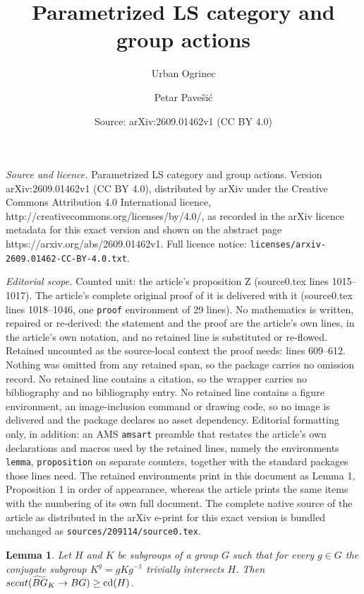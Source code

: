 \documentclass[10pt,a4paper]{amsart}
\title{Parametrized LS category and group actions}
\author{Urban Ogrinec \and Petar Pavešić}
\date{Source: arXiv:2609.01462v1 (CC BY 4.0)}
\newtheorem{lemma}{Lemma}
\newcommand{\cd}{\mathrm{cd}}
\newcommand{\secat}{\mathop{\rm secat}\nolimits}
\begin{document}
\maketitle

\noindent\emph{Source and licence.} Parametrized LS category and group actions. Version arXiv:2609.01462v1 (CC BY 4.0), distributed by arXiv under the Creative Commons Attribution 4.0 International licence, http://creativecommons.org/licenses/by/4.0/, as recorded in the arXiv licence metadata for this exact version and shown on the abstract page https://arxiv.org/abs/2609.01462v1. Full licence notice: \texttt{licenses/arxiv-2609.01462-CC-BY-4.0.txt}.\par\smallskip

\noindent\textit{Editorial scope.} Counted unit: the article's proposition Z (source0.tex lines 1015--1017). The article's complete original proof of it is delivered with it (source0.tex lines 1018--1046, one \texttt{proof} environment of 29 lines). No mathematics is written, repaired or re-derived: the statement and the proof are the article's own lines, in the article's own notation, and no retained line is substituted or re-flowed.  Retained uncounted as the source-local context the proof needs: lines 609--612.  Nothing was omitted from any retained span, so the package carries no omission record.  No retained line contains a citation, so the wrapper carries no bibliography and no bibliography entry.  No retained line contains a figure environment, an image-inclusion command or drawing code, so no image is delivered and the package declares no asset dependency.  Editorial formatting only, in addition: an AMS \texttt{amsart} preamble that restates the article's own declarations and macros used by the retained lines, namely the environments \texttt{lemma}, \texttt{proposition} on separate counters, together with the standard packages those lines need.  The retained environments print in this document as Lemma 1, Proposition 1 in order of appearance, whereas the article prints the same items with the numbering of its own full document.  The complete native source of the article as distributed in the arXiv e-print for this exact version is bundled unchanged as \texttt{sources/209114/source0.tex}.
\begin{lemma}\label{lem:secat of inclusion}
Let $H$ and $K$ be subgroups of a group $G$ such that for every $g\in G$ the conjugate 
subgroup $K^g=g K g^{-1}$ trivially intersects $H$. Then $\secat(\widetilde{BG}_K\to BG)\ge\cd(H)$.    
\end{lemma}
\end{document}
